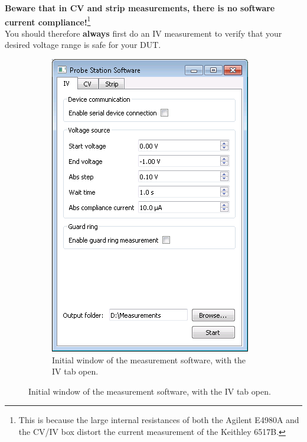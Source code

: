 \documentclass[a4paper]{article}
\begin{document}
{\bf Beware that in CV and strip measurements, there is no software current compliance!}\footnote{This is because the large internal resistances of both the Agilent E4980A and the CV/IV box distort the current measurement of the Keithley 6517B.}\\

You should therefore {\bf always} first do an IV measurement to verify that your desired voltage range is safe for your DUT.\\

\begin{figure}[hbtp]
\centering
\begin{subfigure}[t]{0.475\textwidth}
\centering\captionsetup{width=.8\linewidth}%
\includegraphics[width=\linewidth]{pictures/softiv.png}
\caption[Software with the IV Tab]{Initial window of the measurement software, with the IV tab open.}

\end{subfigure}
\end{figure}
\end{document}
